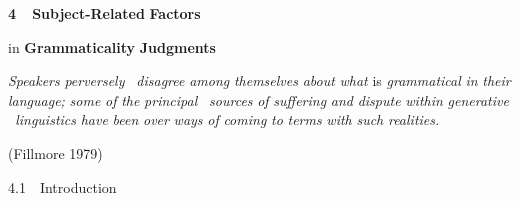\clearpage\setcounter{page}{1}\begin{styleStandard}
\textbf{4\ \ }\textbf{Subject-Related}\textbf{ }\textbf{Factors}
\end{styleStandard}


\begin{styleStandard}
in \textbf{Grammaticality}\textbf{ }\textbf{Judgments}
\end{styleStandard}


\begin{styleStandard}
\textit{Speakers}\textit{ }\textit{perversely }\textit{\ }\textit{disagree}\textit{ }\textit{among}\textit{ }\textit{themselves}\textit{ }\textit{about}\textit{ }\textit{what}\textit{ }is \textit{grammatical}\textit{ }\textit{in}\textit{ }\textit{their}\textit{ }\textit{language;}\textit{ }\textit{some}\textit{ }\textit{of}\textit{ }\textit{the}\textit{ }\textit{principal }\textit{\ }\textit{sources}\textit{ }\textit{of}\textit{ }\textit{suffering}\textit{ }\textit{and}\textit{ }\textit{dispute}\textit{ }\textit{within}\textit{ }\textit{generative }\textit{\ }\textit{linguistics}\textit{ }\textit{have}\textit{ }\textit{been}\textit{ }\textit{over}\textit{ }\textit{ways}\textit{ }\textit{of}\textit{ }\textit{coming}\textit{ }\textit{to}\textit{ }\textit{terms}\textit{ }\textit{with}\textit{ }\textit{such}\textit{ }\textit{realities.}
\end{styleStandard}


\begin{styleStandard}
(Fillmore 1979)
\end{styleStandard}


\begin{styleHeadingvii}
4.1\ \ Introduction
\end{styleHeadingvii}


